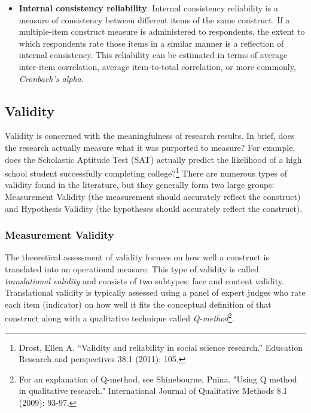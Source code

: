 \begin{itemize}
	\item \textbf{Internal consistency reliability}. Internal consistency reliability is a measure of consistency between different items of the same construct. If a multiple-item construct measure is administered to respondents, the extent to which respondents rate those items in a similar manner is a reflection of internal consistency. This reliability can be estimated in terms of average inter-item correlation, average item-to-total correlation, or more commonly, \textit{Cronbach’s alpha}. 

\end{itemize}

\subsection{Validity}

Validity is concerned with the meaningfulness of research results. In brief, does the research actually measure what it was purported to measure? For example, does the Scholastic Aptitude Test (SAT) actually predict the likelihood of a high school student successfully completing college?\footnote{Drost, Ellen A. ``Validity and reliability in social science research.'' Education Research and perspectives 38.1 (2011): 105.} There are numerous types of validity found in the literature, but they generally form two large groups: Measurement Validity (the measurement should accurately reflect the construct) and Hypothesis Validity (the hypotheses should accurately reflect the construct).

\subsubsection{Measurement Validity}

The theoretical assessment of validity focuses on how well a construct is translated into an operational measure. This type of validity is called \textit{translational validity} and consists of two subtypes: face and content validity. Translational validity is typically assessed using a panel of expert judges who rate each item (indicator) on how well it fits the conceptual definition of that construct along with a qualitative technique called \textit{Q-method}\footnote{For an explanation of Q-method, see Shinebourne, Pnina. "Using Q method in qualitative research." International Journal of Qualitative Methods 8.1 (2009): 93-97.}.

